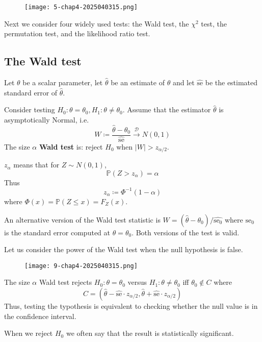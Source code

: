 \begin{figure}[H]
\centering
\texttt{[image: 5-chap4-2025040315.png]}
\label{}
\end{figure}

Next we consider four widely used tests: the Wald test, the $\chi^{2}$ test, the permutation test, and the likelihood ratio test.

\subsection{The Wald test}

Let $\theta$ be a scalar parameter, let $\widehat{\theta}$ be an estimate of $\theta$ and let $\widehat{\text{se}}$ be the estimated standard error of $\widehat{\theta}$.

\begin{definition}
Consider testing $H_0:\theta=\theta_0,H_1:\theta\neq\theta_0$. Assume that the estimator $\widehat{\theta}$ is asymptotically Normal, i.e.
\[
W\coloneqq \frac{\widehat{\theta}-\theta_0}{\widehat{\text{se}}}\overset{ \mathcal{D} }{ \to }N(0,1)
\]
The size $\alpha$ \textbf{Wald test} is: reject $H_0$ when $\lvert W \rvert>z_{\alpha/2}$.
\end{definition}
$z_{\alpha}$ means that for $Z\sim N(0,1)$,
\[
\mathbb{P}(Z>z_{\alpha})=\alpha
\]
Thus
\[
z_{\alpha}\coloneqq \Phi ^{-1}(1-\alpha)
\]
where $\Phi(x)=\mathbb{P}(Z\leq x)=F_{Z}(x)$.

\begin{remark}
An alternative version of the Wald test statistic is $W=(\widehat{\theta}-\theta_0)/\widehat{\text{se}_{0}}$ where $\text{se}_{0}$ is the standard error computed at $\theta=\theta_0$. Both versions of the test is valid.
\end{remark}
Let us consider the power of the Wald test when the null hypothesis is false.
\begin{figure}[H]
\centering
\texttt{[image: 9-chap4-2025040315.png]}
\label{}
\end{figure}

\begin{theorem}
The size $\alpha$ Wald test rejects $H_0:\theta=\theta_0$ versus $H_1:\theta\neq\theta_0$ iff $\theta_0 \not\in C$ where
\[
C=(\widehat{\theta}-\widehat{\text{se}}\cdot z_{\alpha/2},\widehat{\theta}+\widehat{\text{se}}\cdot z_{\alpha/2})
\]
Thus, testing the typothesis is equivalent to checking whether the null value is in the confidence interval.
\end{theorem}
\begin{remark}
When we reject $H_0$ we often say that the result is statistically significant.
\end{remark}
